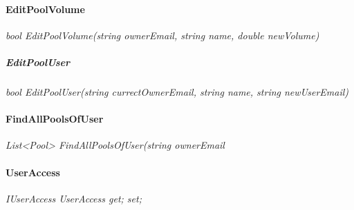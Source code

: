 \paragraph{EditPoolVolume}%

\textit{bool EditPoolVolume(string ownerEmail, string name, double newVolume)}

\subparagraph{EditPoolUser}%

\textit{bool EditPoolUser(string currectOwnerEmail, string name, string newUserEmail)}

\paragraph{FindAllPoolsOfUser}%

\textit{List<Pool> FindAllPoolsOfUser(string ownerEmail}

\paragraph{UserAccess}%

\textit{IUserAccess UserAccess { get; set; }}
